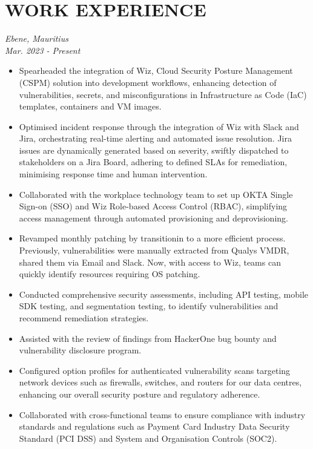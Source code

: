 \documentclass[a4paper, fleqn, oneside]{article}
\begin{document}
\section{WORK EXPERIENCE}
\label{sec:org14429fe}
{ \hfill \textit{Ebene, Mauritius}} \\
{ \hfill {\textit{Mar. 2023 - Present}}}
\begin{itemize}
\item Spearheaded the integration of Wiz, Cloud Security Posture Management (CSPM) solution into development workflows, enhancing detection of vulnerabilities, secrets, and misconfigurations in Infrastructure as Code (IaC) templates, containers and VM images.
\item Optimised incident response through the integration of Wiz with Slack and Jira, orchestrating real-time alerting and automated issue resolution. Jira issues are dynamically generated based on severity, swiftly dispatched to stakeholders on a Jira Board, adhering to defined SLAs for remediation, minimising response time and human intervention.
\item Collaborated with the workplace technology team to set up OKTA Single Sign-on (SSO) and Wiz Role-based Access Control (RBAC), simplifying access management through automated provisioning and deprovisioning.
\item Revamped monthly patching by transitionin to a more efficient process. Previously, vulnerabilities were manually extracted from Qualys VMDR, shared them via Email and Slack. Now, with access to Wiz, teams can quickly identify resources requiring OS patching.
\item Conducted comprehensive security assessments, including API testing, mobile SDK testing, and segmentation testing, to identify vulnerabilities and recommend remediation strategies.
\item Assisted with the review of findings from HackerOne bug bounty and vulnerability disclosure program.
\item Configured option profiles for authenticated vulnerability scans targeting network devices such as firewalls, switches, and routers for our data centres, enhancing our overall security posture and regulatory adherence.
\item Collaborated with cross-functional teams to ensure compliance with industry standards and regulations such as Payment Card Industry Data Security Standard (PCI DSS) and System and Organisation Controls (SOC2).
\end{itemize}
\end{document}
